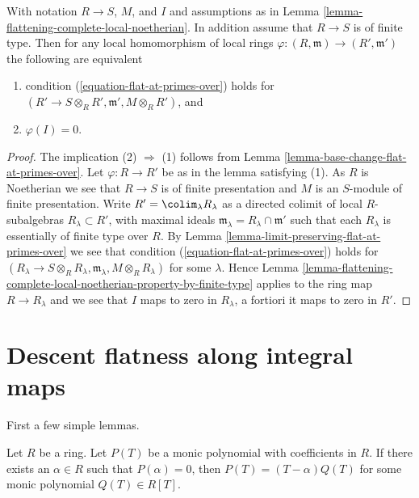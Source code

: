\begin{lemma}
\label{lemma-flattening-complete-local-universal-property}
With notation $R \to S$, $M$, and $I$ and assumptions as in
Lemma \ref{lemma-flattening-complete-local-noetherian}.
In addition assume that $R \to S$ is of finite type.
Then for any local homomorphism of local rings
$\varphi : (R, \mathfrak m) \to (R', \mathfrak m')$
the following are equivalent
\begin{enumerate}
\item condition (\ref{equation-flat-at-primes-over}) holds
for $(R' \to S \otimes_R R', \mathfrak m', M \otimes_R R')$, and
\item $\varphi(I) = 0$.
\end{enumerate}
\end{lemma}

\begin{proof}
The implication (2) $\Rightarrow$ (1) follows from
Lemma \ref{lemma-base-change-flat-at-primes-over}.
Let $\varphi : R \to R'$ be as in the lemma satisfying (1).
As $R$ is Noetherian we see that $R \to S$ is of finite presentation
and $M$ is an $S$-module of finite presentation.
Write $R' = \colim_\lambda R_\lambda$
as a directed colimit of local $R$-subalgebras $R_\lambda \subset R'$,
with maximal ideals $\mathfrak m_\lambda = R_\lambda \cap \mathfrak m'$
such that each $R_\lambda$ is essentially of finite type over $R$. By
Lemma \ref{lemma-limit-preserving-flat-at-primes-over}
we see that condition (\ref{equation-flat-at-primes-over}) holds for
$(R_\lambda \to S \otimes_R R_\lambda, \mathfrak m_\lambda,
M \otimes_R R_\lambda)$ for some $\lambda$. Hence
Lemma \ref{lemma-flattening-complete-local-noetherian-property-by-finite-type}
applies to the ring map $R \to R_\lambda$ and we see that
$I$ maps to zero in $R_\lambda$, a fortiori it maps to zero in $R'$.
\end{proof}




\section{Descent flatness along integral maps}
\label{section-descent-flatness-integral}

\noindent
First a few simple lemmas.

\begin{lemma}
\label{lemma-have-one-root}
Let $R$ be a ring. Let $P(T)$ be a monic polynomial with coefficients
in $R$. If there exists an $\alpha \in R$ such that $P(\alpha) = 0$, then
$P(T) = (T - \alpha)Q(T)$ for some monic polynomial $Q(T) \in R[T]$.
\end{lemma}

